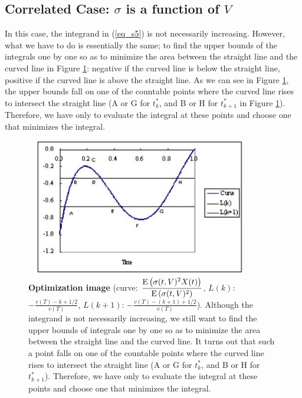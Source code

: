 \subsection{ Correlated Case: $\sigma$ is a function of $V$}
In this case, the integrand in (\ref{eq_s5}) is not necessarily increasing. However, what we have to do is essentially the same; to find the upper bounds of the integrals one by one so as to minimize the area between the straight line and the curved line in Figure \ref{fg_s3}: negative if the curved line is below the straight line, positive if the curved line is above the straight line.  As we can see in Figure \ref{fg_s3}, the upper bounds fall on one of the countable points where the curved line rises to intersect the straight line (A or G for $t_k^*$, and B or H for $t_{k+1}^*$ in Figure \ref{fg_s3}).  Therefore, we have only to evaluate the integral at these points and choose one that minimizes the integral.

\begin{figure}[htbp]
\begin{center}
 \includegraphics[width=10cm,height=6cm]{fg_s3n.png}
\end{center}
\caption[Optimization image]
{{\bf Optimization image} (curve: $\displaystyle \frac{{\mathrm{E}}\left( \sigma(t,V)^2X(t) \right)}{{\mathrm{E}}\left( \sigma(t,V)^2 \right)}$, $L(k)$:
$\displaystyle -\frac{v(T)-k+1/2}{v(T)}$, $L(k+1)$: $\displaystyle -\frac{v(T)-(k+1)+1/2}{v(T)}$).
 \quad Although the integrand is not necessarily increasing, we still want to find the upper bounds of integrals one
 by one so as to minimize the area between the straight line and the curved line.
 It turns out that such a point falls on one of the countable points where the curved line rises to intersect
the straight line (A or G for $t_k^*$, and B or H for $t_{k+1}^*$).
 Therefore, we have only to evaluate the integral at these points and choose one that minimizes the
integral.}\label{fg_s3}
\end{figure}


